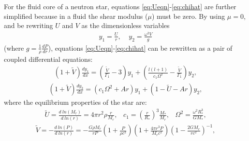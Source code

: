 \documentclass[fleqn,usenatbib]{mnras}
\begin{document}
\hspace{\parindent}For the fluid core of a neutron star, equations \ref{eq:Ueqn}-\ref{eq:chihat} are further simplified because in a fluid the shear modulus ($\mu$) must be zero. By using $\mu=0$, and be rewriting $U$ and $V$ as the dimensionless variables
\begin{align}
y_1=\frac{U}{r},\;\;\;\;y_2=\frac{\omega^2V}{g}
\label{eq:y1y2}
\end{align}
\noindent (where $g=\frac{1}{\rho}\frac{dP}{dr}$), equations \ref{eq:Ueqn}-\ref{eq:chihat} can be rewritten as a pair of coupled differential equations:
\begin{align}
\left(1+\tilde{V}\right)\frac{dy_1}{dx}=\left(\frac{\tilde{V}}{\Gamma_1}-3\right)y_1+\left(\frac{l(l+1)}{c_1\Omega^2}-\frac{\tilde{V}}{\Gamma_1}\right)y_2,
\label{eq:McDy1}
\end{align}
\begin{align}
\left(1+\tilde{V}\right)\frac{dy_2}{dx}=\left(c_1\Omega^2+Ar\right)y_1+\left(1-\tilde{U}-Ar\right)y_2,
\label{eq:McDy2}
\end{align}
\noindent where the equilibrium properties of the star are: 
\begin{align}\nonumber
\tilde{U}=\frac{d\:ln\left(M_r\right)}{d\:ln\left(r\right)}=4\pi r^2\rho\frac{r}{M_r},\;\;\;c_1=\left(\frac{r}{R_*}\right)^3\frac{M_*}{M_r},\;\;\;\Omega^2=\frac{\omega^2R_*^3}{GM_*},
\label{eq:eqbm_properties1}
\end{align}
\begin{align}\nonumber
\tilde{V}=-\frac{d\:ln\left(P\right)}{d\:ln\left(r\right)}=-\frac{G\rho M_r}{rP}\left(1+\frac{P}{\rho c^2}\right)\left(1+\frac{4\pi r^3 P}{M_r c^2}\right)\left(1-\frac{2GM_r}{rc^2}\right)^{-1},
\label{eq:eqbm_properties2}
\end{align}
\end{document}
